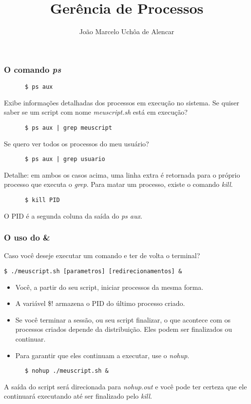 \documentclass{beamer}
\title{Gerência de Processos}
\author[João Marcelo Uchôa de Alencar]{João Marcelo Uchôa de Alencar}
\institute{Universidade Federal do Ceará - Quixadá}
\begin{document}
   \begin{frame}
      \titlepage
   \end{frame}

   \begin{frame}[fragile]
      \frametitle{O comando \textit{ps}}
      \begin{verbatim}
      $ ps aux 
      \end{verbatim}
      Exibe informações detalhadas dos processos em execução no sistema. Se quiser saber se um script com nome \textit{meuscript.sh} está em execução? 
      \begin{verbatim}
      $ ps aux | grep meuscript
      \end{verbatim}
      Se quero ver todos os processos do meu usuário? 
      \begin{verbatim}
      $ ps aux | grep usuario
      \end{verbatim}
      Detalhe: em ambos os casos acima, uma linha extra é retornada para o próprio processo que executa o \textit{grep}. Para matar um processo, existe o comando \textit{kill}. 
      \begin{verbatim}
      $ kill PID
      \end{verbatim}
      O PID é a segunda coluna da saída do \textit{ps aux}.
\end{frame}

   \begin{frame}[fragile]
      \frametitle{O uso do \&}
      Caso você deseje executar um comando e ter de volta o terminal?
      \begin{verbatim}
$ ./meuscript.sh [parametros] [redirecionamentos] &
      \end{verbatim}
      \begin{itemize}
         \item Você, a partir do seu script, iniciar processos da mesma forma.
         \item A variável \$! armazena o PID do último processo criado. 
         \item Se você terminar a sessão, ou seu script finalizar, o que acontece com os processos criados depende da distribuição. Eles podem ser finalizados ou continuar. 
         \item Para garantir que eles continuam a executar, use o \textit{nohup}. 
      \end{itemize}
      \begin{verbatim}	   
      $ nohup ./meuscript.sh &
      \end{verbatim}	       
      A saída do script será direcionada para \textit{nohup.out} e você pode ter certeza que ele continuará executando até ser finalizado pelo \textit{kill}.
   \end{frame}
\end{document}

